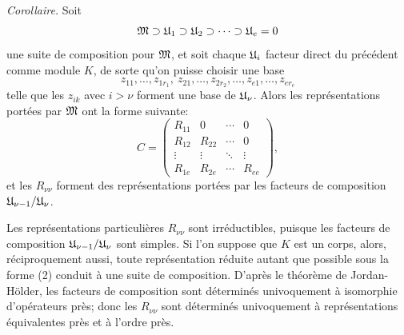 \emph{Corollaire.} Soit
\[
        \mathfrak{M}\supset \mathfrak{U}_1\supset \mathfrak{U}_2\supset\cdots\supset \mathfrak{U}_e=0
\]
une suite de composition pour $\mathfrak{M}$, et soit chaque $\mathfrak{U}_i$ facteur direct du précédent comme module $K$, de sorte qu'on puisse choisir une base
\[
        z_{11},\ldots,z_{1r_1},\ z_{21},\ldots,z_{2r_2},\ldots,
        z_{e1},\ldots,z_{er_e}
\]
telle que les $z_{ik}$ avec $i>\nu$ forment une base de $\mathfrak{U}_\nu$. Alors les représentations portées par $\mathfrak{M}$ ont la forme suivante:
\[
 C=\begin{pmatrix}
 R_{11}&0&\cdots&0\\
 R_{12}&R_{22}&\cdots&0\\
 \vdots&\vdots&\ddots&\vdots\\
 R_{1e}&R_{2e}&\cdots&R_{ee}
 \end{pmatrix},                                      \tag{2}
\]
et les $R_{\nu\nu}$ forment des représentations portées par les facteurs de composition $\mathfrak{U}_{\nu-1}/\mathfrak{U}_\nu$.

Les représentations particulières $R_{\nu\nu}$ sont irréductibles, puisque les facteurs de composition $\mathfrak{U}_{\nu-1}/\mathfrak{U}_\nu$ sont simples. Si l'on suppose que $K$ est un corps, alors, réciproquement aussi, toute représentation réduite autant que possible sous la forme (2) conduit à une suite de composition. D'après le théorème de Jordan-Hölder, les facteurs de composition sont déterminés univoquement à isomorphie d'opérateurs près; donc les $R_{\nu\nu}$ sont déterminés univoquement à représentations équivalentes près et à l'ordre près.

